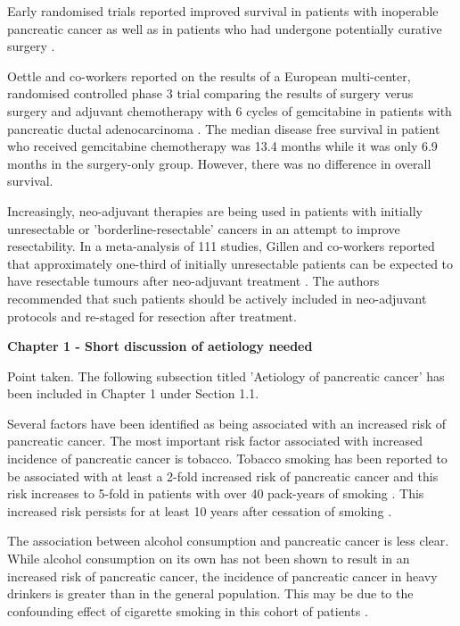 	Early randomised trials reported improved survival in patients with inoperable pancreatic cancer \parencite{mallinson_chemotherapy_1980} as well as in patients who had undergone potentially curative surgery \parencite{bakkevold_adjuvant_1993}. 
	
	Oettle and co-workers reported on the results of a European multi-center, randomised controlled phase 3 trial comparing the results of surgery verus surgery and adjuvant chemotherapy with 6 cycles of gemcitabine in patients with pancreatic ductal adenocarcinoma \parencite{oettle_adjuvant_2007}. 
	The median disease free survival in patient who received gemcitabine chemotherapy was 13.4 months while it was only 6.9 months in the surgery-only group. 
	However, there was no difference in overall survival.
	
	Increasingly, neo-adjuvant therapies are being used in patients with initially unresectable or 'borderline-resectable' cancers in an attempt to improve resectability. 
	In a meta-analysis of 111 studies, Gillen and co-workers reported that approximately one-third of initially unresectable patients can be expected to have resectable tumours after neo-adjuvant treatment \parencite{gillen_preoperative/neoadjuvant_2010}. 
	The authors recommended that such patients should be actively included in neo-adjuvant protocols and re-staged for resection after treatment.
	
		
\textbf{Chapter 1 - Short discussion of aetiology needed}
	
	Point taken. The following subsection titled 'Aetiology of pancreatic cancer' has been included in Chapter 1 under Section 1.1.
	
	Several factors have been identified as being associated with an increased risk of pancreatic cancer.
	The most important risk factor associated with increased incidence of pancreatic cancer is tobacco. 
	Tobacco smoking has been reported to be associated with at least a 2-fold increased risk of pancreatic cancer and this risk increases to 5-fold in patients with over 40 pack-years of smoking \parencite{raimondi_early_2007, iodice_tobacco_2008}. 
	This increased risk persists for at least 10 years after cessation of smoking \parencite{iodice_tobacco_2008}.
	
	The association between alcohol consumption and pancreatic cancer is less clear. 
	While alcohol consumption on its own has not been shown to result in an increased risk of pancreatic cancer, the incidence of pancreatic cancer in heavy drinkers is greater than in the general population.
	This may be due to the confounding effect of cigarette smoking in this cohort of patients \parencite{jiao_alcohol_2009, rohrmann_ethanol_2009}.
	
